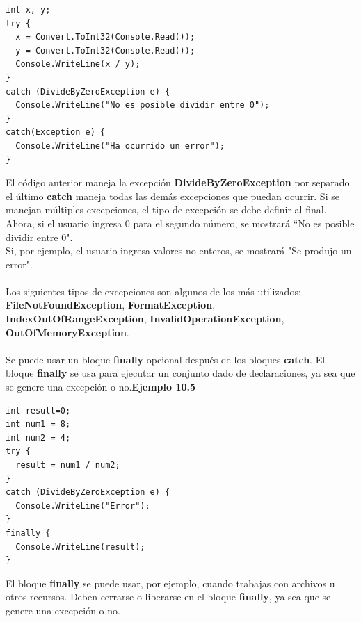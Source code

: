 \documentclass[12pt,a4paper]{report}
\begin{document}
\begin{lstlisting}
int x, y;
try {
  x = Convert.ToInt32(Console.Read());
  y = Convert.ToInt32(Console.Read());
  Console.WriteLine(x / y);
}
catch (DivideByZeroException e) {
  Console.WriteLine("No es posible dividir entre 0");
}
catch(Exception e) {
  Console.WriteLine("Ha ocurrido un error");
}
\end{lstlisting}El código anterior maneja la excepción\textbf{ DivideByZeroException} por separado. el último\textbf{ catch} maneja todas las demás excepciones que puedan ocurrir. Si se manejan múltiples excepciones, el tipo de excepción se debe definir al final.\\Ahora, si el usuario ingresa 0 para el segundo número, se mostrará ``No es posible dividir entre 0".\\Si, por ejemplo, el usuario ingresa valores no enteros, se mostrará "Se produjo un error".\\\\Los siguientes tipos de excepciones son algunos de los más utilizados:\textbf{ FileNotFoundException},\textbf{ FormatException},\textbf{ IndexOutOfRangeException},\textbf{ InvalidOperationException},\textbf{ OutOfMemoryException}.\\\\Se puede usar un bloque\textbf{ finally} opcional después de los bloques\textbf{ catch}. El bloque\textbf{ finally} se usa para ejecutar un conjunto dado de declaraciones, ya sea que se genere una excepción o no.\textbf{Ejemplo 10.5}
\begin{lstlisting}
int result=0;
int num1 = 8;
int num2 = 4;
try {
  result = num1 / num2;
}
catch (DivideByZeroException e) {
  Console.WriteLine("Error");
}
finally {
  Console.WriteLine(result);
}
\end{lstlisting}El bloque\textbf{ finally} se puede usar, por ejemplo, cuando trabajas con archivos u otros recursos. Deben cerrarse o liberarse en el bloque\textbf{ finally}, ya sea que se genere una excepción o no.
\end{document}

